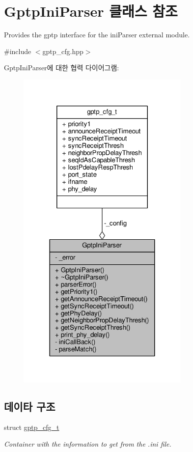 \hypertarget{class_gptp_ini_parser}{}\section{Gptp\+Ini\+Parser 클래스 참조}
\label{class_gptp_ini_parser}


Provides the gptp interface for the ini\+Parser external module.  




{\ttfamily \#include $<$gptp\+\_\+cfg.\+hpp$>$}



Gptp\+Ini\+Parser에 대한 협력 다이어그램\+:
\nopagebreak
\begin{figure}[H]
\begin{center}
\leavevmode
\includegraphics[width=240pt]{class_gptp_ini_parser__coll__graph}
\end{center}
\end{figure}
\subsection*{데이타 구조}
\begin{DoxyCompactItemize}
\item 
struct \hyperlink{struct_gptp_ini_parser_1_1gptp__cfg__t}{gptp\+\_\+cfg\+\_\+t}
\begin{DoxyCompactList}\small\item\em Container with the information to get from the .ini file. \end{DoxyCompactList}\end{DoxyCompactItemize}
